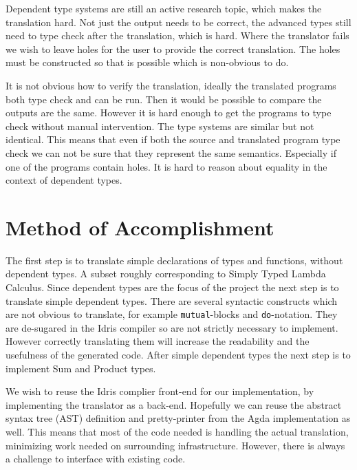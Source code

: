 \documentclass[parskip=half]{scrartcl}
\begin{document}
Dependent type systems are still an active research topic, which makes the
translation hard.  Not just the output needs to be correct, the advanced types
still need to type check after the translation, which is hard.  Where the
translator fails we wish to leave holes for the user to provide the correct
translation. The holes must be constructed so that is possible which is
non-obvious to do.

It is not obvious how to verify the translation, ideally the translated
programs both type check and can be run. Then it would be possible to compare
the outputs are the same. However it is hard enough to get the programs to type
check without manual intervention. The type systems are similar but not
identical. This means that even if both the source and translated program
type check we can not be sure that they represent the same semantics.
Especially if one of the programs contain holes. It is hard to reason about
equality in the context of dependent types.


\section{Method of Accomplishment}
The first step is to translate simple declarations of types and functions,
without dependent types. A subset roughly corresponding to Simply Typed Lambda
Calculus. Since dependent types are the focus of the project the next step is
to translate simple dependent types. There are several syntactic constructs
which are not obvious to translate, for example \texttt{mutual}-blocks and
\texttt{do}-notation. They are de-sugared in the Idris compiler so are not strictly
necessary to implement. However correctly translating them will increase the
readability and the usefulness of the generated code. After simple dependent
types the next step is to implement Sum and Product types.


We wish to reuse the Idris complier front-end for our implementation, by
implementing the translator as a back-end. Hopefully we can reuse the abstract
syntax tree (AST) definition and pretty-printer from the Agda implementation as
well. This means that most of the code needed is handling the actual
translation, minimizing work needed on surrounding infrastructure.  However,
there is always a challenge to interface with existing code.
\end{document}

